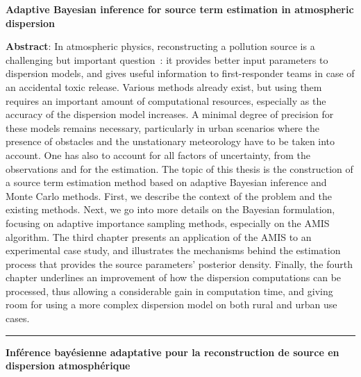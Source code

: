 \thispagestyle{empty}

\begin{flushright}
\textbf{{ Adaptive Bayesian inference for source term estimation in atmospheric dispersion}}
\end{flushright}
{\small \textbf{Abstract}: In atmospheric physics, reconstructing a pollution source is a challenging but important question : it provides better input parameters to dispersion models, and gives useful information to first-responder teams in case of an accidental toxic release.
Various methods already exist, but using them requires an important amount of computational resources, especially as the accuracy of the dispersion model increases. A minimal degree of precision for these models remains necessary, particularly in urban scenarios where the presence of obstacles and the unstationary meteorology have to be taken into account. One has also to account for all factors of uncertainty, from the observations and for the estimation. 
The topic of this thesis is the construction of a source term estimation method based on adaptive Bayesian inference and Monte Carlo methods. First, we describe the context of the problem and the existing methods. Next, we go into more details on the Bayesian formulation, focusing on adaptive importance sampling methods, especially on the AMIS algorithm. The third chapter presents an application of the AMIS to an experimental case study, and illustrates the mechanisms behind the estimation process that provides the source parameters’ posterior density. Finally, the fourth chapter underlines an improvement of how the dispersion computations can be processed, thus allowing a considerable gain in computation time, and giving room for using a more complex dispersion model on both rural and urban use cases.
}
\rule{\linewidth}{.5pt}
\begin{flushright}
	\textbf{{Inférence bayésienne adaptative pour la reconstruction de source en dispersion atmosphérique}}
\end{flushright}
